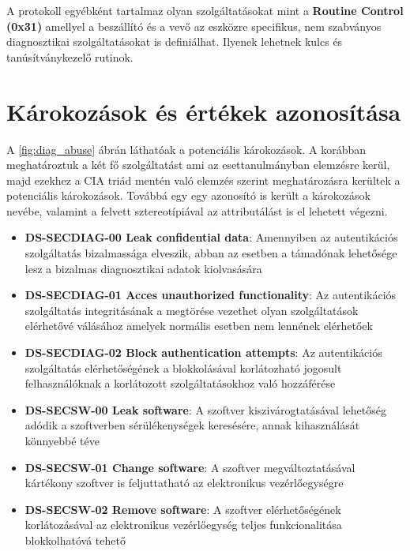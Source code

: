 A protokoll egyébként tartalmaz olyan szolgáltatásokat mint a \textbf{Routine Control (0x31)} amellyel a beszállító és a vevő az eszközre specifikus, nem szabványos diagnosztikai szolgáltatásokat is definiálhat. Ilyenek lehetnek kulcs és tanúsítványkezelő rutinok.

\section{Károkozások és értékek azonosítása}

A \ref{fig:diag_abuse} ábrán láthatóak a potenciális károkozások. A korábban meghatároztuk a két fő szolgáltatást ami az esettanulmányban elemzésre kerül, majd ezekhez a CIA triád mentén való elemzés szerint meghatározásra kerültek a potenciális károkozások. Továbbá egy egy azonosító is került a károkozások nevébe, valamint a felvett sztereotípiával az attributálást is el lehetett végezni.

\begin{itemize}
	\item \textbf{DS-SECDIAG-00 Leak confidential data}: Amennyiben az autentikációs szolgáltatás bizalmassága elveszik, abban az esetben a támadónak lehetősége lesz a bizalmas diagnosztikai adatok kiolvasására
	\item \textbf{DS-SECDIAG-01 Acces unauthorized functionality}: Az autentikációs szolgáltatás integritásának a megtörése vezethet olyan szolgáltatások elérhetővé válásához amelyek normális esetben nem lennének elérhetőek
	\item \textbf{DS-SECDIAG-02 Block authentication attempts}: Az autentikációs szolgáltatás elérhetőségének a blokkolásával korlátozható jogosult felhasználóknak a korlátozott szolgáltatásokhoz való hozzáférése
	\item \textbf{DS-SECSW-00 Leak software}: A szoftver kiszivárogtatásával lehetőség adódik a szoftverben sérülékenységek keresésére, annak kihasználását könnyebbé téve
	\item \textbf{DS-SECSW-01 Change software}: A szoftver megváltoztatásával kártékony szoftver is feljuttatható az elektronikus vezérlőegységre
	\item \textbf{DS-SECSW-02 Remove software}: A szoftver elérhetőségének korlátozásával az elektronikus vezérlőegység teljes funkcionalitása blokkolhatóvá tehető
\end{itemize}

